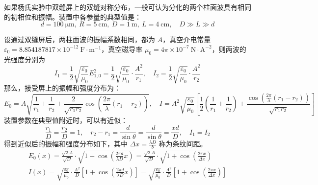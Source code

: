 \documentclass[UTF8]{report}
\theoremstyle{MyLineTheoremStyle} %
\theoremstyle{MyBlockTheoremStyle} %
\theoremstyle{MySubsubsectionStyle} %
\begin{document}
如果杨氏实验中双缝屏上的双缝对称分布，一般可认为分化的两个柱面波具有相同的初相位和振幅。装置中各参量的典型值是：
\begin{equation}
d = 100 \ \mathrm{\mu m},\  R = 5\ \mathrm{cm},\ D = 1\ \mathrm{m},\ L = 4 \ \mathrm{cm},\quad D \gg L \gg d
\end{equation}

设通过双缝屏后，两柱面波的振幅系数相同，都为 $A$，真空介电常量 $\varepsilon_0 = 8.854187817 \times 10^{-12}\ \mathrm{F\cdot m^{-1}}$，真空磁导率 $\mu_0 = 4\pi \times 10^{-7}\ \mathrm{N\cdot A^{-2}}$，则两波的光强度分别为
\begin{equation}
    I_1 = \frac{1}{2}\sqrt{\frac{\varepsilon_0}{\mu_0}}E_{1,0}^2 = \frac{1}{2}\sqrt{\frac{\varepsilon_0}{\mu_0}} \cdot \frac{A^2}{r_1},\quad
    I_2 = \frac{1}{2}\sqrt{\frac{\varepsilon_0}{\mu_0}} \cdot \frac{A^2}{r_2}
\end{equation}
那么，接受屏上的振幅和强度分布为：
\begin{equation}
    E_0 = A \sqrt{ \frac{1}{r_1} + \frac{1}{r_2} + \frac{2}{\sqrt{r_1r_2}} \cos \left( \frac{2 \pi}{\lambda}(r_1 - r_2) \right)  }  ,\quad 
    I = A^2\sqrt{\frac{\varepsilon_0}{\mu_0}}\left[ \frac{1}{2}\left( \frac{1}{r_1} + \frac{1}{r_2} \right) + \frac{\cos \left( \frac{2 \pi}{\lambda}(r_1 - r_2) \right)}{\sqrt{r_1r_2} } \right]
\end{equation}
装置参数在典型值附近时，可以有近似：
\begin{equation}\label{杨氏双缝干涉近似}
\frac{r_1}{D} = \frac{r_2}{D} = 1,\quad r_2 - r_1 = \frac{d}{\sin \theta} = \frac{d}{\sin \theta} = \frac{x d}{ D },\quad I_1 = I_2
\end{equation}
得到近似后的振幅和强度分布如下，其中 $\Delta x= \frac{\lambda D}{b}$ 称为条纹间距。
\begin{gather}\label{杨氏双缝干涉近似结果}
    E_0(x) = \frac{\sqrt{2}A}{\sqrt{D}} \cdot \sqrt{1 + \cos \left( \frac{2 \pi d}{\lambda D}x \right)} = \frac{\sqrt{2}A}{\sqrt{D}} \cdot \sqrt{1 + \cos \left( \frac{2 \pi x}{\Delta x} \right)} \\ 
    I(x) = \sqrt{\frac{\varepsilon_0}{\mu_0}} \cdot \frac{A^2}{D} \left[ 1 + \cos \left( \frac{2 \pi  d}{\lambda D }x \right) \right] = \sqrt{\frac{\varepsilon_0}{\mu_0}} \cdot \frac{A^2}{D} \left[ 1 + \cos \left( \frac{2 \pi x}{\Delta x} \right) \right]
\end{gather}
\end{document}
